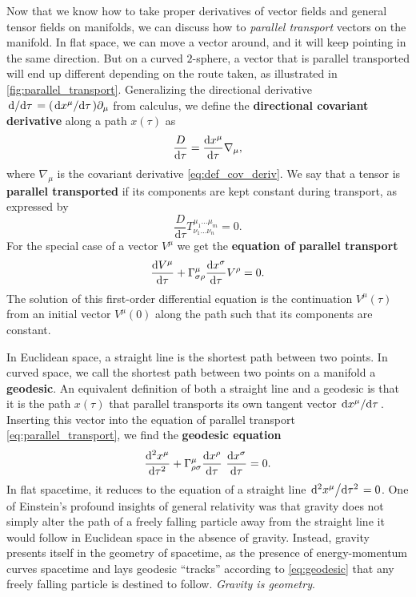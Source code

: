 Now that we know how to take proper derivatives of vector fields and general tensor fields on manifolds, we can discuss how to \emph{parallel transport} vectors on the manifold.
In flat space, we can move a vector around, and it will keep pointing in the same direction.
But on a curved $2$-sphere, a vector that is parallel transported will end up different depending on the route taken, as illustrated in \cref{fig:parallel_transport}.
Generalizing the directional derivative $\odv{}/{\tau} = (\odv{x^\mu}/{\tau}) \partial_\mu$ from calculus, we define the \textbf{directional covariant derivative} along a path $x(\tau)$ as
\begin{equation}
	\frac{D}{\mathrm{d} \tau} = \odv{x^\mu}{\tau} \nabla_\mu,
\end{equation}
where $\nabla_\mu$ is the covariant derivative \eqref{eq:def_cov_deriv}.
We say that a tensor is \textbf{parallel transported} if its components are kept constant during transport, as expressed by
\begin{equation}
	\frac{D}{\mathrm{d} \tau} T^{\mu_1 \ldots \mu_m}_{\nu_1 \ldots \nu_n} = 0 .
\end{equation}
For the special case of a vector $V^\mu$ we get the \textbf{equation of parallel transport}
\begin{equation}
	\odv{V^\mu}{\tau} + \Gamma^{\mu}_{\sigma \rho} \odv{x^\sigma}{\tau} V^\rho = 0 .
	\label{eq:parallel_transport}
\end{equation}
The solution of this first-order differential equation is the continuation $V^\mu(\tau)$ from an initial vector $V^\mu(0)$ along the path such that its components are constant.

In Euclidean space, a straight line is the shortest path between two points.
In curved space, we call the shortest path between two points on a manifold a \textbf{geodesic}.
An equivalent definition of both a straight line and a geodesic is that it is the path $x(\tau)$ that parallel transports its own tangent vector $\odv{x^\mu}/{\tau}$.
Inserting this vector into the equation of parallel transport \eqref{eq:parallel_transport}, we find the \textbf{geodesic equation}
\begin{equation}
	\odv[2]{x^\mu}{\tau} + \Gamma^\mu_{\rho \sigma} \odv{x^\rho}{\tau} \odv{x^\sigma}{\tau} = 0 .
	\label{eq:geodesic}
\end{equation}
In flat spacetime, it reduces to the equation of a straight line $\odv[2]{x^\mu}/{\tau} = 0$.
One of Einstein's profound insights of general relativity was that gravity does not simply alter the path of a freely falling particle away from the straight line it would follow in Euclidean space in the absence of gravity.
Instead, gravity presents itself in the geometry of spacetime, as the presence of energy-momentum curves spacetime and lays geodesic ``tracks'' according to \cref{eq:geodesic} that any freely falling particle is destined to follow.
\emph{Gravity is geometry}.

